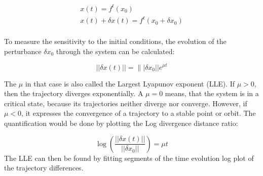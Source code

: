 \documentclass[main]{subfiles}
\begin{document}
\chapter{} %

\label{AppendixA} %



\begin{align*}
x(t) = f^t(x_0)\\
x(t) + \delta x(t) = f^t(x_0 + \delta x_0)\\
\end{align*}

To measure the sensitivity to the initial conditions, the evolution of the perturbance \(\delta x_0\) through the system can be calculated:

\[||\delta x(t)|| = \||\delta x_0|| e^{\mu t}\]

The \(\mu\) in that case is also called the Largest Lyapunov exponent (LLE).%
%
If \(\mu > 0\), then the trajectory diverges exponentially. %
%
A \(\mu = 0\) means, that the system is in a critical state, because its trajectories neither diverge nor converge. %
%
However, if \(\mu < 0\), it expresses the convergence of a trajectory to a stable point or orbit. %
%
The quantification would be done by plotting the Log divergence distance ratio:

\[\log\left(\frac{||\delta x(t)||}{||\delta x_0||}\right) = \mu t\]
%
The LLE can then be found by fitting segments of the time evolution log plot of the trajectory differences. 
\end{document}
